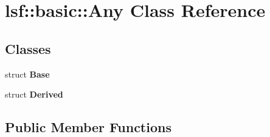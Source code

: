 \hypertarget{classlsf_1_1basic_1_1Any}{
\section{lsf::basic::Any Class Reference}
\label{classlsf_1_1basic_1_1Any}
}
\subsection*{Classes}
\begin{DoxyCompactItemize}
\item 
struct {\bfseries Base}
\item 
struct {\bfseries Derived}
\end{DoxyCompactItemize}
\subsection*{Public Member Functions}
